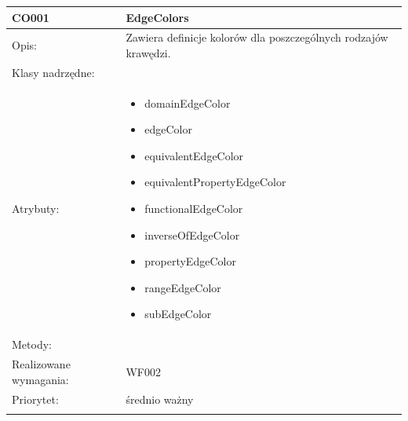 \documentclass[a4paper,10pt]{article}
\begin{document}
\begin{center}
 


\begin{longtable}{|m{3cm}|m{9cm}|} \hline

CO001 & EdgeColors \\ \hline
Opis: & Zawiera definicje kolorów dla poszczególnych rodzajów krawędzi.   \\ \hline
Klasy nadrzędne: &     \\ \hline
Atrybuty: & \begin{itemize}
 \item domainEdgeColor
 \item edgeColor
 \item equivalentEdgeColor
 \item equivalentPropertyEdgeColor
 \item functionalEdgeColor
 \item inverseOfEdgeColor
 \item propertyEdgeColor
 \item rangeEdgeColor
 \item subEdgeColor

\end{itemize}
 \\ \hline
Metody: & %
  \\ \hline
Realizowane wymagania: & WF002 \\ \hline
Priorytet: & średnio ważny \\ \hline

\multicolumn{2}{c}{} \\
 \hline


\end{longtable}
\end{center}
\end{document}
